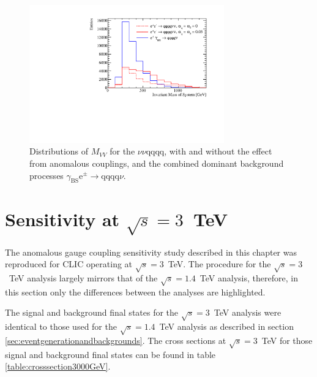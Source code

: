\begin{figure}[h!]
\centering
\includegraphics[width=0.75\textwidth]{PhysicsAnalysis/Plots/NuisanceFit/1400GeV/NuisanceExplanation.pdf}
\caption[Distributions of $M_{VV}$ for the $\nu\nu\text{qqqq}$, with and without the effect from anomalous couplings, and the combined dominant background processes $\gamma_{\text{BS}}\text{e}^{\pm} \rightarrow \text{qqqq}\nu$.]{Distributions of $M_{VV}$ for the $\nu\nu\text{qqqq}$, with and without the effect from anomalous couplings, and the combined dominant background processes $\gamma_{\text{BS}}\text{e}^{\pm} \rightarrow \text{qqqq}\nu$.}
\label{fig:nuisanceexplanation1400GeV}
\end{figure}


\section{Sensitivity at $\sqrt{s}=3$~TeV}
The anomalous gauge coupling sensitivity study described in this chapter was reproduced for CLIC operating at $\sqrt{s}=3$~TeV.  The procedure for the $\sqrt{s}=3$~TeV analysis largely mirrors that of the $\sqrt{s}=1.4$~TeV analysis, therefore, in this section only the differences between the analyses are highlighted.  

The signal and background final states for the $\sqrt{s}=3$~TeV analysis were identical to those used for the $\sqrt{s}=1.4$~TeV analysis as described in section \ref{sec:eventgenerationandbackgrounds}.  The cross sections at $\sqrt{s}=3$~TeV for those signal and background final states can be found in table \ref{table:crosssection3000GeV}.  

